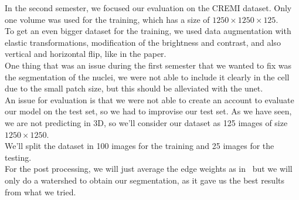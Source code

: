 In the second semester, we focused our evaluation on the CREMI dataset. Only
one volume was used for the training, which has a size of $1250\times 1250\times 125$.\\
To get an even bigger dataset for the training, we used data augmentation with
elastic transformations, modification of the brightness and contrast, and also vertical and horizontal flip, like in the paper.\\

One thing that was an issue during the first semester that we wanted to fix was
the segmentation of the nuclei, we were not able to include it clearly in the
cell due to the small patch size, but this should be alleviated with the
unet.\\

An issue for evaluation is that we were not able to create an account to
evaluate our model on the test set, so we had to improvise our test set.
As we have seen, we are not predicting in 3D, so we’ll consider our dataset as 125 images of size $1250\times 1250$.\\ 
We’ll split the dataset in 100 images for the training and 25 images for the testing.\\

For the post processing, we will just average the edge weights as
in~\cite{funke_large_2019} but we will only do a watershed to obtain our
segmentation, as it gave us the best results from what we tried.

